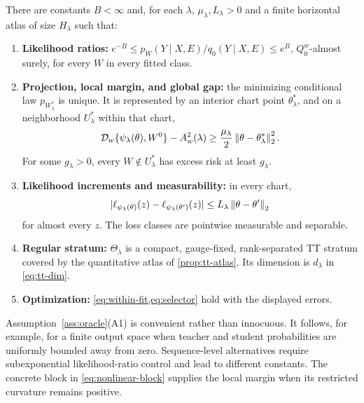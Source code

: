 \begin{assumption}
\label{ass:oracle}
There are constants \(B<\infty\) and, for each \(\lambda\), \(\mu_\lambda,L_\lambda>0\) and a finite horizontal atlas of size \(H_\lambda\) such that:
\begin{enumerate}[label=(A\arabic*),leftmargin=*]
    \item \textbf{Likelihood ratios:} \(e^{-B}\le p_W(Y\mid X,E)/q_0(Y\mid X,E)\le e^B\), \(Q_0^w\)-almost surely, for every \(W\) in every fitted class.
    \item \textbf{Projection, local margin, and global gap:} the minimizing conditional law \(p_{W_\lambda^*}\) is unique. It is represented by an interior chart point \(\theta_\lambda^*\), and on a neighborhood \(U_\lambda^*\) within that chart,
    \[
    \mathcal D_w\{\psi_\lambda(\theta),W^0\}-A_w^2(\lambda)
    \ge\frac{\mu_\lambda}{2}\left\lVert \theta-\theta_\lambda^*\right\rVert_2^2.
    \]
    For some \(g_\lambda>0\), every \(W\notin U_\lambda^*\) has excess risk at least \(g_\lambda\).
    \item \textbf{Likelihood increments and measurability:} in every chart,
    \[
    |\ell_{\psi_\lambda(\theta)}(z)-
      \ell_{\psi_\lambda(\theta')}(z)|
    \le L_\lambda\left\lVert \theta-\theta'\right\rVert_2
    \]
    for almost every \(z\). The loss classes are pointwise measurable and separable.
    \item \textbf{Regular stratum:} \(\Theta_\lambda\) is a compact, gauge-fixed, rank-separated TT stratum covered by the quantitative atlas of \cref{prop:tt-atlas}. Its dimension is \(d_\lambda\) in \cref{eq:tt-dim}.
    \item \textbf{Optimization:} \cref{eq:within-fit,eq:selector} hold with the displayed errors.
\end{enumerate}
\end{assumption}

Assumption~\ref{ass:oracle}(A1) is convenient rather than innocuous. It follows, for example, for a finite output space when teacher and student probabilities are uniformly bounded away from zero. Sequence-level alternatives require subexponential likelihood-ratio control and lead to different constants. The concrete block in \cref{eq:nonlinear-block} supplies the local margin when its restricted curvature remains positive.

